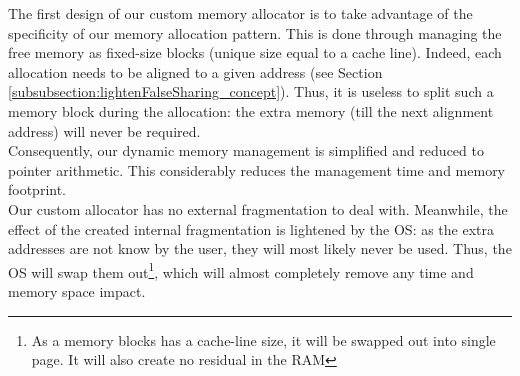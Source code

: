 			The first design of our custom memory allocator is to take advantage of the specificity of our memory allocation pattern.   This is done through managing the free memory as fixed-size blocks (unique size equal to a cache line).   Indeed, each allocation needs to be aligned to a given address (see Section \ref{subsubsection:lightenFalseSharing_concept}).  Thus, it is useless to split such a memory block during the allocation: the extra memory (till the next alignment address) will never be required.\\
			Consequently, our dynamic memory management is simplified and reduced to pointer arithmetic.   This considerably reduces the management time and memory footprint.\\
			Our custom allocator has no external fragmentation to deal with.   Meanwhile, the effect of the created internal fragmentation is lightened by the OS: as the extra addresses are not know by the user, they will most likely never be used.   Thus, the OS will swap them out\footnote{As a memory blocks has a cache-line size, it will be swapped out into single page.   It will also create no residual in the RAM}, which will almost completely remove any time and memory space impact.\\

